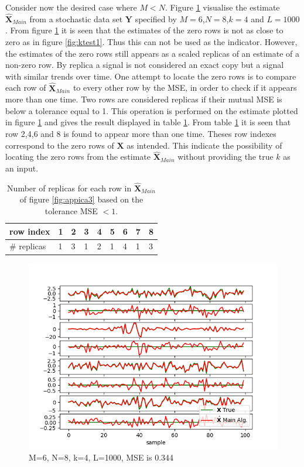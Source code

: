 Consider now the desired case where $M<N$.  
Figure \ref{fig:ktest3} visualise the estimate $\hat{\textbf{X}}_{Main}$ from a stochastic data set $\textbf{Y}$ specified by $M=6$,$N=8$,$k=4$ and $L=1000$.
From figure \ref{fig:ktest3} it is seen that the estimates of the zero rows is not as close to zero as in figure \ref{fig:ktest1}. Thus this can not be used as the indicator. However, the estimates of the zero rows still appears as a scaled replicas of an estimate of a non-zero row. By replica a signal is not considered an exact copy but a signal with similar trends over time.
One attempt to locate the zero rows is to compare each row of $\hat{\textbf{X}}_{Main}$ to every other row by the MSE, in order to check if it appears more than one time.
Two rows are considered replicas if their mutual MSE is below a tolerance equal to 1. This operation is performed on the estimate plotted in figure \ref{fig:ktest3} and gives the result displayed in table \ref{tab:replica1}.
From table \ref{tab:replica1} it is seen that row 2,4,6 and 8 is found to appear more than one time. Theses row indexes correspond to the zero rows of $\textbf{X}$ as intended. This indicate the possibility of locating the zero rows from the estimate $\hat{\textbf{X}}_{Main}$ without providing the true $k$ as an input.      

\begin{table}[h]
\center
\begin{tabular}{|l|l|l|l|l|l|l|l|l|}
\hline
row index   & 1 & 2 & 3 & 4 & 5 & 6 & 7 & 8 \\ \hline
\# replicas & 1 & 3 & 1 & 2 & 1 & 4 & 1 & 3 \\ \hline
\end{tabular}
\caption{Number of replicas for each row in $\hat{\textbf{X}}_{Main}$ of figure \ref{fig:appica3} based on the tolerance MSE $< 1$. }
\label{tab:replica1}
\end{table}

\begin{figure}[H]
	\centering
	\includegraphics[scale=0.5]{figures/ch_estimate/k_test3.png}
	\caption{M=6, N=8, k=4, L=1000, MSE is 0.344}
	\label{fig:ktest3}
\end{figure}

